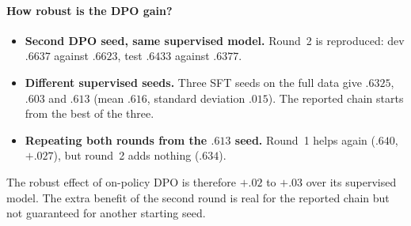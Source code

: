 \documentclass[11pt,a4paper]{article}
\begin{document}
\paragraph{How robust is the DPO gain?}
\begin{itemize}[leftmargin=*]
\item \textbf{Second DPO seed, same supervised model.} Round~2 is reproduced: dev $.6637$ against $.6623$, test $.6433$ against $.6377$.
\item \textbf{Different supervised seeds.} Three SFT seeds on the full data give $.6325$, $.603$ and $.613$ (mean $.616$, standard deviation $.015$). The reported chain starts from the best of the three.
\item \textbf{Repeating both rounds from the $.613$ seed.} Round~1 helps again ($.640$, $+.027$), but round~2 adds nothing ($.634$).
\end{itemize}
The robust effect of on-policy DPO is therefore $+.02$ to $+.03$ over its supervised model. The extra benefit of the second round is real for the reported chain but not guaranteed for another starting seed.
\end{document}
